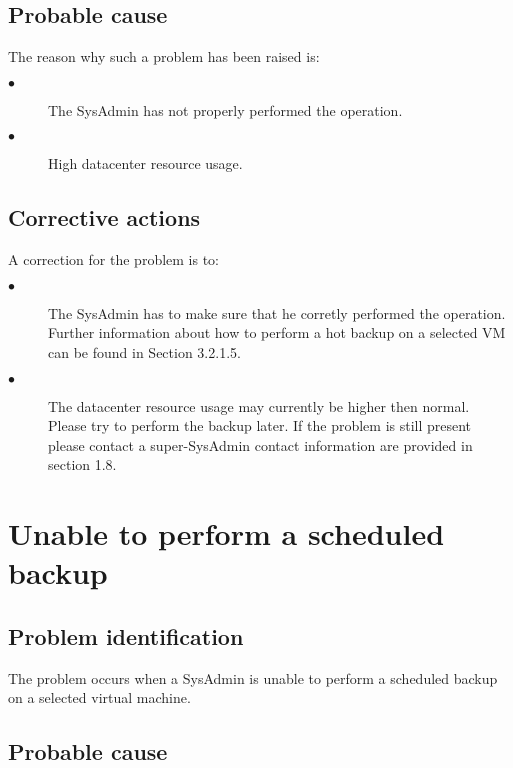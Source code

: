 \subsection{Probable cause}

The reason why such a problem has been raised is:\\
\begin{description}
  \item[$\bullet$] The SysAdmin has not properly performed the operation.
  \item[$\bullet$] High datacenter resource usage.
\end{description}


\subsection{Corrective actions}

A correction for the problem is to:\\
\begin{description}
  \item[$\bullet$] The SysAdmin has to make sure that he corretly performed the operation. 
Further information about how to perform a hot backup on a selected VM can be found in 
Section 3.2.1.5.
  \item[$\bullet$] The datacenter resource usage may currently be higher then normal. Please
try to perform the backup later. If the problem is still present please contact a super-SysAdmin
contact information are provided in section 1.8.
\end{description}








\section{Unable to perform a scheduled backup}

\subsection{Problem identification}
The problem occurs when a SysAdmin is unable to perform a scheduled
backup on a selected virtual machine.

\subsection{Probable cause}

